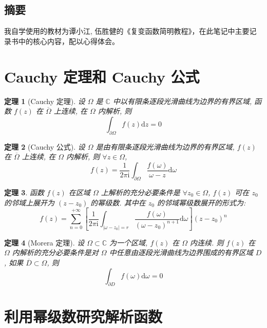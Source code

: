 \documentclass[12pt,a4paper]{article}
\newtheorem{thm}{定理}[section]  %
\begin{document}
\begin{center}
\section*{摘要}
\end{center}


我自学使用的教材为谭小江, 伍胜健的《复变函数简明教程》，在此笔记中主要记录书中的核心内容，配以心得体会。


{\centering\tableofcontents}

\newpage
\section{Cauchy 定理和 Cauchy 公式}
\begin{thm}[Cauchy 定理]
    设 $\Omega$ 是 $\mathbb{C}$ 中以有限条逐段光滑曲线为边界的有界区域, 函数 $f(z)$ 在 $\overline{\Omega}$ 上连续, 在 $\Omega$ 内解析, 则
    \[\int_{\partial \Omega} f(z) \mathrm{d}z = 0\]
\end{thm}

\begin{thm}[Cauchy 公式]
    设 $\Omega$ 是由有限条逐段光滑曲线为边界的有界区域, $f(z)$ 在 $\overline{\Omega}$ 上连续, 在 $\Omega$ 内解析, 则 $\forall z \in \Omega$, 
    \[f(z) = \frac{1}{2\pi \mathrm{i}} \int_{\partial \Omega} \frac{f(\omega)}{\omega - z} \mathrm{d} \omega\]
\end{thm}

\begin{thm}
    函数 $f(z)$ 在区域 $\Omega$ 上解析的充分必要条件是 $\forall z_0 \in \Omega$, $f(z)$ 可在 $z_0$ 的邻域上展开为 $(z - z_0)$ 的幂级数. 其中在 $z_0$ 的邻域幂级数展开的形式为:
    \[f(z) = \sum\limits_{n = 0}^{+\infty} \left[ \frac{1}{2\pi \mathrm{i}} \int_{|\omega - z_0| = r} \frac{f(\omega)}{(\omega - z_0)^{n+1}} \mathrm{d} \omega \right] (z-z_0)^n\]
\end{thm}   

\begin{thm}[Morera 定理]
    设 $\Omega \subset \mathbb{C}$ 为一个区域, $f(z)$ 在 $\Omega$ 内连续. 则 $f(z)$ 在 $\Omega$ 内解析的充分必要条件是对 $\Omega$ 中任意由逐段光滑曲线为边界围成的有界区域 $D$, 如果 $\overline{D} \subset \Omega$, 则
    \[\int_{\partial D} f(\omega) \mathrm{d} \omega = 0\]
\end{thm}

\section{利用幂级数研究解析函数}
\end{document}
